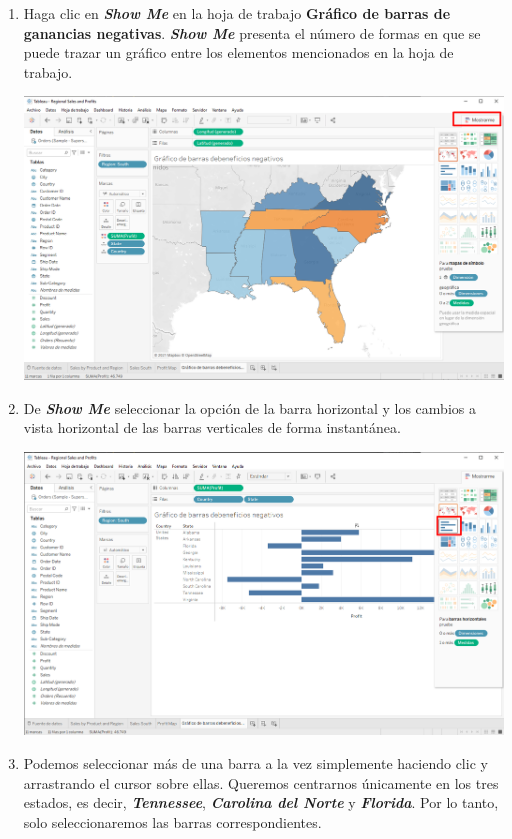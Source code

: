 \documentclass[12pt,letterpaper]{article}
\begin{document}
\begin{enumerate}
\begin{center}
        \end{center}
        \item Haga clic en \textit{\textbf{Show Me}} en la hoja de trabajo \textbf{Gráfico de barras de ganancias negativas}. \textit{\textbf{Show Me}} presenta el número de formas en que se puede trazar un gráfico entre los elementos mencionados en la hoja de trabajo.
        \begin{center}
            \includegraphics[width=15cm]{./img/img43.png}
        \end{center}
        \item De \textit{\textbf{Show Me}} seleccionar la opción de la barra horizontal y los cambios a vista horizontal de las barras verticales de forma instantánea.
        \begin{center}
            \includegraphics[width=15cm]{./img/img44.png}
        \end{center}
        \item Podemos seleccionar más de una barra a la vez simplemente haciendo clic y arrastrando el cursor sobre ellas. Queremos centrarnos únicamente en los tres estados, es decir, \textit{\textbf{Tennessee}}, \textit{\textbf{Carolina del Norte}} y \textit{\textbf{Florida}}. Por lo tanto, solo seleccionaremos las barras correspondientes.

\end{enumerate}
\end{document}
